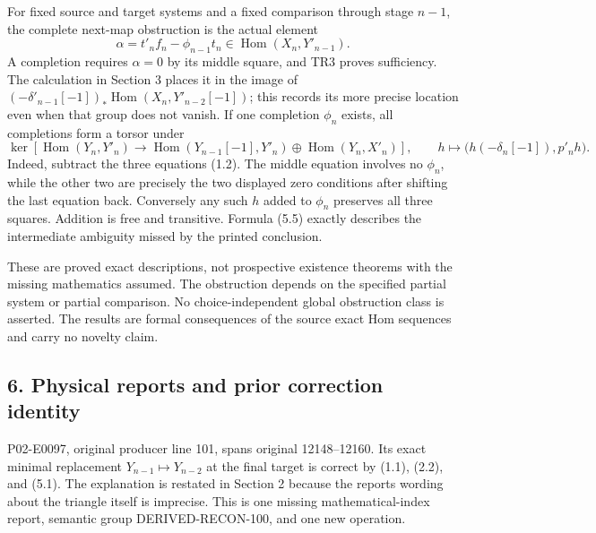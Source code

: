For fixed source and target systems and a fixed comparison through stage \(n-1\),\allowbreak{} the complete next-map obstruction is the actual element \[
\alpha=t'_nf_n-\phi_{n-1}t_n\in\operatorname{Hom}(X_n,Y'_{n-1}). \tag{5.4}
\] A completion requires \(\alpha=0\) by its middle square,\allowbreak{} and TR3 proves sufficiency. The calculation in Section 3 places it in the image of \((-\delta'_{n-1}[-1])_*\operatorname{Hom}(X_n,Y'_{n-2}[-1])\); this records its more precise location even when that group does not vanish. If one completion \(\phi_n\) exists,\allowbreak{} all completions form a torsor under \[
\ker\!\left[
\operatorname{Hom}(Y_n,Y'_n)\longrightarrow
\operatorname{Hom}(Y_{n-1}[-1],Y'_n)\oplus\operatorname{Hom}(Y_n,X'_n)
\right],\qquad
h\longmapsto\big(h(-\delta_n[-1]),p'_nh\big). \tag{5.5}
\] Indeed,\allowbreak{} subtract the three equations (1.2)\allowbreak{}. The middle equation involves no \(\phi_n\),\allowbreak{} while the other two are precisely the two displayed zero conditions after shifting the last equation back. Conversely any such \(h\) added to \(\phi_n\) preserves all three squares. Addition is free and transitive. Formula (5.5)\allowbreak{} exactly describes the intermediate ambiguity missed by the printed conclusion.

These are proved exact descriptions,\allowbreak{} not prospective existence theorems with the missing mathematics assumed. The obstruction depends on the specified partial system or partial comparison. No choice-independent global obstruction class is asserted. The results are formal consequences of the source exact Hom sequences and carry no novelty claim.

\subsection{6. Physical reports and prior correction identity}\label{proofs-12008-12370-physical-reports-and-prior-correction-identity}

P02-E0097,\allowbreak{} original producer line 101,\allowbreak{} spans original 12148–\allowbreak{}12160. Its exact minimal replacement \(Y_{n-1}\mapsto Y_{n-2}\) at the final target is correct by (1.1)\allowbreak{},\allowbreak{} (2.2)\allowbreak{},\allowbreak{} and (5.1)\allowbreak{}. The explanation is restated in Section 2 because the report\textquotesingle s wording about the triangle itself is imprecise. This is one missing mathematical-index report,\allowbreak{} semantic group DERIVED-RECON-100,\allowbreak{} and one new operation.


